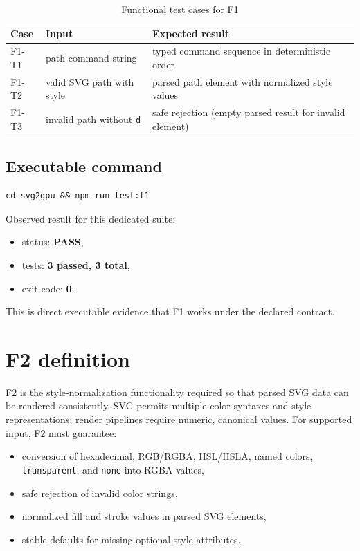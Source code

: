 \begin{table}[htbp]
\centering
\caption{Functional test cases for F1}
\label{tab:f1_matrix_compact}
\begin{tabular}{>{\raggedright\arraybackslash}p{1.8cm} >{\raggedright\arraybackslash}p{4.0cm} >{\raggedright\arraybackslash}p{6.6cm}}
\toprule
\textbf{Case} & \textbf{Input} & \textbf{Expected result} \\
\midrule
F1-T1 & path command string & typed command sequence in deterministic order \\
F1-T2 & valid SVG path with style & parsed path element with normalized style values \\
F1-T3 & invalid path without \texttt{d} & safe rejection (empty parsed result for invalid element) \\
\bottomrule
\end{tabular}
\end{table}

\subsection{Executable command}

\begin{verbatim}
cd svg2gpu && npm run test:f1
\end{verbatim}

Observed result for this dedicated suite:

\begin{itemize}
\item status: \textbf{PASS},
\item tests: \textbf{3 passed, 3 total},
\item exit code: \textbf{0}.
\end{itemize}

This is direct executable evidence that F1 works under the declared contract.

\section{F2 definition}

F2 is the style-normalization functionality required so that parsed SVG data can be rendered consistently.
SVG permits multiple color syntaxes and style representations; render pipelines require numeric, canonical values.
For supported input, F2 must guarantee:

\begin{itemize}
\item conversion of hexadecimal, RGB/RGBA, HSL/HSLA, named colors, \texttt{transparent}, and \texttt{none} into RGBA values,
\item safe rejection of invalid color strings,
\item normalized fill and stroke values in parsed SVG elements,
\item stable defaults for missing optional style attributes.
\end{itemize}

